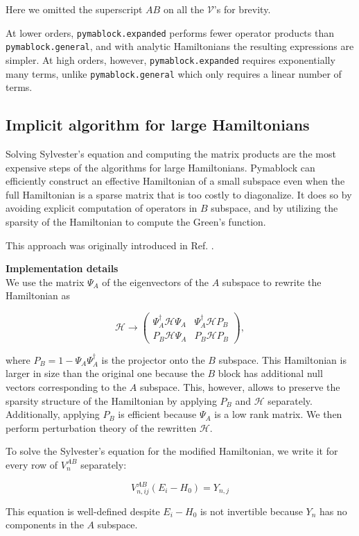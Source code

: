 Here we omitted the superscript $AB$ on all the $\mathcal{V}$'s for brevity.

At lower orders, \texttt{pymablock.expanded} performs fewer operator
products than \texttt{pymablock.general}, and with analytic Hamiltonians
the resulting expressions are simpler.
At high orders, however, \texttt{pymablock.expanded} requires exponentially
many terms, unlike \texttt{pymablock.general} which only requires a linear
number of terms.

\subsection{Implicit algorithm for large Hamiltonians}

Solving Sylvester's equation and computing the matrix products are the most
expensive steps of the algorithms for large Hamiltonians.
Pymablock can efficiently construct an effective Hamiltonian of a small
subspace even when the full Hamiltonian is a sparse matrix that is too costly to
diagonalize.
It does so by avoiding explicit computation of operators in $B$ subspace, and by
utilizing the sparsity of the Hamiltonian to compute the Green's function.

This approach was originally introduced in Ref.
\cite{https://doi.org/10.48550/arxiv.1909.09649}.

\begin{framed}
\textbf{Implementation details}\\
We use the matrix $\Psi_A$ of the eigenvectors of the $A$ subspace to rewrite
the Hamiltonian as

\begin{equation}
\label{H_implicit}
\mathcal{H} \to \begin{pmatrix}
\Psi_A^\dagger \mathcal{H} \Psi_A & \Psi_A^\dagger \mathcal{H} P_B \\
P_B \mathcal{H} \Psi_A & P_B \mathcal{H} P_B
\end{pmatrix},
\end{equation}

where $P_B = 1 - \Psi_A \Psi_A^\dagger$ is the projector onto the $B$ subspace.
This Hamiltonian is larger in size than the original one because the $B$ block has
additional null vectors corresponding to the $A$ subspace.
This, however, allows to preserve the sparsity structure of the Hamiltonian by applying
$P_B$ and $\mathcal{H}$ separately.
Additionally, applying $P_B$ is efficient because $\Psi_A$ is a low rank matrix.
We then perform perturbation theory of the rewritten $\mathcal{H}$.

To solve the Sylvester's equation for the modified Hamiltonian, we write it for
every row of $V_n^{AB}$ separately:

\begin{equation}
V_{n, ij}^{AB} (E_i - H_0) = Y_{n, j}
\end{equation}

This equation is well-defined despite $E_i - H_0$ is not invertible because
$Y_{n}$ has no components in the $A$ subspace.
\end{framed}
